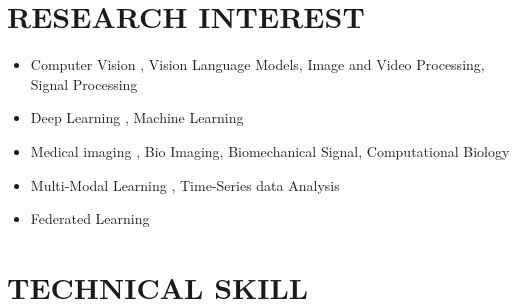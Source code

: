 \documentclass[a4paper,7 pt]{article}
\begin{document}

\section{RESEARCH INTEREST}

\begin{itemize}
    \item Computer Vision , Vision Language Models, Image and Video Processing, Signal Processing
    \item Deep Learning , Machine Learning
    \item Medical imaging , Bio Imaging, Biomechanical Signal, Computational Biology
    \item Multi-Modal Learning ,  Time-Series data Analysis
    \item Federated Learning

\end{itemize}



\section{TECHNICAL SKILL}
\end{document}
